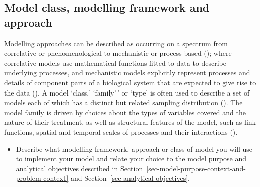 \documentclass[
]{article}
\providecommand{\tightlist}{%
  \setlength{\itemsep}{0pt}\setlength{\parskip}{0pt}}
\begin{document}
\subsection{Model class, modelling framework and
approach}\label{model-class-modelling-framework-and-approach}

\begin{tcolorbox}[enhanced jigsaw, opacitybacktitle=0.6, bottomrule=.15mm, leftrule=.75mm, rightrule=.15mm, colbacktitle=quarto-callout-note-color!10!white, toprule=.15mm, titlerule=0mm, left=2mm, colframe=quarto-callout-note-color-frame, breakable, title=\textcolor{quarto-callout-note-color}{\faInfo}\hspace{0.5em}{Explanation}, opacityback=0, coltitle=black, bottomtitle=1mm, colback=white, toptitle=1mm, arc=.35mm]

Modelling approaches can be described as occurring on a spectrum from
correlative or phenomenological to mechanistic or process-based
(); where correlative models
use mathematical functions fitted to data to describe underlying
processes, and mechanistic models explicitly represent processes and
details of component parts of a biological system that are expected to
give rise to the data (). A model `class,' `family'\,' or `type' is often used to describe
a set of models each of which has a distinct but related sampling
distribution (). The
model family is driven by choices about the types of variables covered
and the nature of their treatment, as well as structural features of the
model, such as link functions, spatial and temporal scales of processes
and their interactions ().

\end{tcolorbox}

\begin{tcolorbox}[enhanced jigsaw, opacitybacktitle=0.6, bottomrule=.15mm, leftrule=.75mm, rightrule=.15mm, colbacktitle=quarto-callout-caution-color!10!white, toprule=.15mm, titlerule=0mm, left=2mm, colframe=quarto-callout-caution-color-frame, breakable, title=\textcolor{quarto-callout-caution-color}{\faFire}\hspace{0.5em}{Preregistration Item}, opacityback=0, coltitle=black, bottomtitle=1mm, colback=white, toptitle=1mm, arc=.35mm]

\begin{itemize}
\tightlist
\item[$\square$]
  Describe what modelling framework, approach or class of model you will
  use to implement your model and relate your choice to the model
  purpose and analytical objectives described in
  Section~\ref{sec-model-purpose-context-and-problem-context} and
  Section~\ref{sec-analytical-objectives}.
\end{itemize}

\end{tcolorbox}
\end{document}
